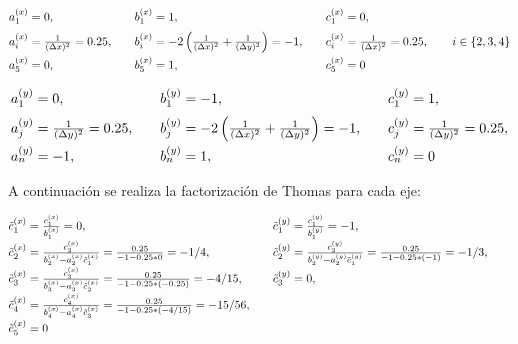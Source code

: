 \documentclass[11pt,a4paper]{article}
\begin{document}
\begin{equation}
\begin{array}{@{}l@{\qquad}l@{\qquad}l@{}}
a_1^{(x)} = 0, &
b_1^{(x)} = 1, &
c_1^{(x)} = 0, \\[0.6em]
a_i^{(x)} = \frac{1}{(\Delta x)^2} = 0.25, &
b_i^{(x)} = -2\left(\frac{1}{(\Delta x)^2}+\frac{1}{(\Delta y)^2}\right) = -1, &
c_i^{(x)} = \frac{1}{(\Delta x)^2} = 0.25, \qquad i \in \left\{ 2, 3, 4 \right\} \\[0.6em]
a_{5}^{(x)} = 0, &
b_{5}^{(x)} = 1, &
c_{5}^{(x)} = 0
\end{array}
\end{equation}

\bigskip

\begin{equation}
\begin{array}{@{}l@{\qquad}l@{\qquad}l@{}}
a_1^{(y)} = 0, &
b_1^{(y)} = -1, &
c_1^{(y)} = 1, \\[0.6em]
a_j^{(y)} = \frac{1}{(\Delta y)^2} = 0.25, &
b_j^{(y)} = -2\left(\frac{1}{(\Delta x)^2}+\frac{1}{(\Delta y)^2}\right) = -1, &
c_j^{(y)} = \frac{1}{(\Delta y)^2} = 0.25, \\[0.6em]
a_{n}^{(y)} = -1, &
b_{n}^{(y)} = 1, &
c_{n}^{(y)} = 0
\end{array}
\end{equation}

A continuaci\'on se realiza la factorizaci\'on de Thomas para cada eje:

\begin{equation}
\begin{array}{@{}l@{\qquad}l@{\qquad}l@{}}
\tilde{c}_1^{(x)} = \frac{c_1^{(x)}}{b_1^{(x)}} = 0, 
& \tilde{c}_1^{(y)} = \frac{c_1^{(y)}}{b_1^{(y)}} = -1, \\[0.6em]
\tilde{c}_2^{(x)} = \frac{c_2^{(x)}}{b_2^{(x)} - a_2^{(x)} \tilde{c}_1^{(x)}}
 = \frac{0.25}{-1 - 0.25*0} = -1/4, 
& \tilde{c}_2^{(y)} = \frac{c_2^{(y)}}{b_2^{(y)} - a_2^{(y)} \tilde{c}_1^{(y)}}
 = \frac{0.25}{-1 - 0.25*(-1)} = -1/3, \\[0.6em]
\tilde{c}_3^{(x)} = \frac{c_3^{(x)}}{b_3^{(x)} - a_3^{(x)} \tilde{c}_2^{(x)}}
 = \frac{0.25}{-1 - 0.25*(-0.25)} = -4/15,
& \tilde{c}_3^{(y)} = 0, \\[0.6em]
\tilde{c}_4^{(x)} = \frac{c_4^{(x)}}{b_4^{(x)} - a_4^{(x)} \tilde{c}_3^{(x)}}
 = \frac{0.25}{-1 - 0.25*(-4/15)} = -15/56,
& \\[0.6em]
\tilde{c}_5^{(x)} = 0 &  
\end{array}
\end{equation}
\end{document}
